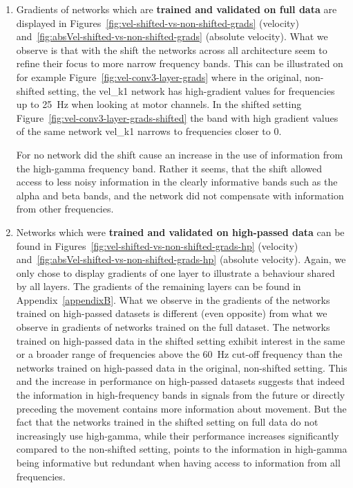 \begin{enumerate}
    \item Gradients of networks which are \textbf{trained and validated on full data} are displayed in Figures~\ref{fig:vel-shifted-vs-non-shifted-grads} (velocity) and~\ref{fig:absVel-shifted-vs-non-shifted-grads} (absolute velocity).
    What we observe is that with the shift the networks across all architecture seem to refine their focus to more narrow frequency bands.
    This can be illustrated on for example Figure~\ref{fig:vel-conv3-layer-grads} where in the original, non-shifted setting, the vel\_k1 network has high-gradient values for frequencies up to 25~Hz when looking at motor channels.
    In the shifted setting Figure~\ref{fig:vel-conv3-layer-grads-shifted} the band with high gradient values of the same network vel\_k1 narrows to frequencies closer to 0.
    
    For no network  did the shift cause an increase in the use of information from the high-gamma frequency band.
    Rather it seems, that the shift allowed access to less noisy information in the clearly informative bands such as the alpha and beta bands, and the network did not compensate with information from other frequencies.
    
    \item Networks which were \textbf{trained and validated on high-passed data} can be found in Figures~\ref{fig:vel-shifted-vs-non-shifted-grads-hp} (velocity) and~\ref{fig:absVel-shifted-vs-non-shifted-grads-hp} (absolute velocity).
    Again, we only chose to display gradients of one layer to illustrate a behaviour shared by all layers.
    The gradients of the remaining layers can be found in Appendix~\ref{appendixB}.
    What we observe in the gradients of the networks trained on high-passed datasets is different (even opposite) from what we observe in gradients of networks trained on the full dataset.
    The networks trained on high-passed data in the shifted setting exhibit interest in the same or a broader range of frequencies above the 60~Hz cut-off frequency than the networks trained on high-passed data in the original, non-shifted setting.
    This and the increase in performance on high-passed datasets suggests that indeed the information in high-frequency bands in signals from the future or directly preceding the movement contains more information about movement.
    But the fact that the networks trained in the shifted setting on full data do not increasingly use high-gamma, while their performance increases significantly compared to the non-shifted setting, points to the information in high-gamma being informative but redundant when having access to information from all frequencies.
\end{enumerate}

